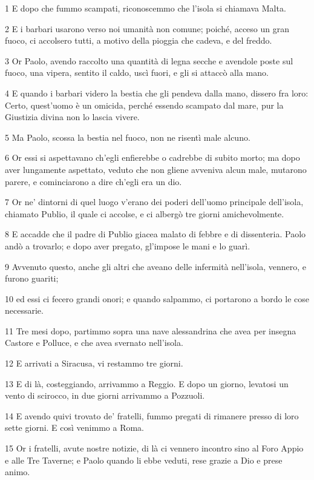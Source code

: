 \par 1 E dopo che fummo scampati, riconoscemmo che l'isola si chiamava Malta.
\par 2 E i barbari usarono verso noi umanità non comune; poiché, acceso un gran fuoco, ci accolsero tutti, a motivo della pioggia che cadeva, e del freddo.
\par 3 Or Paolo, avendo raccolto una quantità di legna secche e avendole poste sul fuoco, una vipera, sentito il caldo, uscì fuori, e gli si attaccò alla mano.
\par 4 E quando i barbari videro la bestia che gli pendeva dalla mano, dissero fra loro: Certo, quest'uomo è un omicida, perché essendo scampato dal mare, pur la Giustizia divina non lo lascia vivere.
\par 5 Ma Paolo, scossa la bestia nel fuoco, non ne risentì male alcuno.
\par 6 Or essi si aspettavano ch'egli enfierebbe o cadrebbe di subito morto; ma dopo aver lungamente aspettato, veduto che non gliene avveniva alcun male, mutarono parere, e cominciarono a dire ch'egli era un dio.
\par 7 Or ne' dintorni di quel luogo v'erano dei poderi dell'uomo principale dell'isola, chiamato Publio, il quale ci accolse, e ci albergò tre giorni amichevolmente.
\par 8 E accadde che il padre di Publio giacea malato di febbre e di dissenteria. Paolo andò a trovarlo; e dopo aver pregato, gl'impose le mani e lo guarì.
\par 9 Avvenuto questo, anche gli altri che aveano delle infermità nell'isola, vennero, e furono guariti;
\par 10 ed essi ci fecero grandi onori; e quando salpammo, ci portarono a bordo le cose necessarie.
\par 11 Tre mesi dopo, partimmo sopra una nave alessandrina che avea per insegna Castore e Polluce, e che avea svernato nell'isola.
\par 12 E arrivati a Siracusa, vi restammo tre giorni.
\par 13 E di là, costeggiando, arrivammo a Reggio. E dopo un giorno, levatosi un vento di scirocco, in due giorni arrivammo a Pozzuoli.
\par 14 E avendo quivi trovato de' fratelli, fummo pregati di rimanere presso di loro sette giorni. E così venimmo a Roma.
\par 15 Or i fratelli, avute nostre notizie, di là ci vennero incontro sino al Foro Appio e alle Tre Taverne; e Paolo quando li ebbe veduti, rese grazie a Dio e prese animo.

